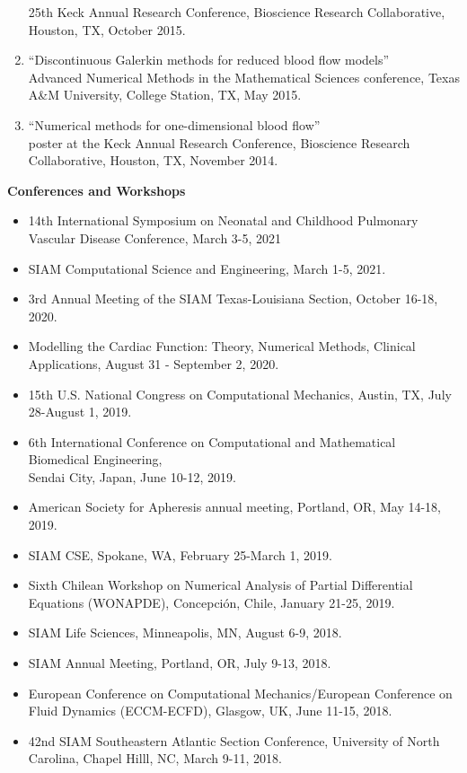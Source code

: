 \documentclass{article} %
\begin{document}
\begin{enumerate}
25th Keck Annual Research Conference, Bioscience Research Collaborative, Houston, TX,  October 2015.
\item ``Discontinuous Galerkin methods for reduced blood flow models'' \\
Advanced Numerical Methods in the Mathematical Sciences conference, Texas A\&M University, College Station, TX, May 2015.
\item ``Numerical methods for one-dimensional blood flow'' \\
poster at the Keck Annual Research Conference, Bioscience Research Collaborative, Houston, TX, November 2014. 
\end{enumerate}

\vspace{0.5cm}
\noindent
{\bf \large Conferences and Workshops}
\begin{itemize}
\item 14th International Symposium on Neonatal and Childhood Pulmonary Vascular Disease Conference, March 3-5, 2021
\item SIAM Computational Science and Engineering, March 1-5, 2021.
\item 3rd Annual Meeting of the SIAM Texas-Louisiana Section, October 16-18, 2020. 
\item Modelling the Cardiac Function: Theory, Numerical Methods, Clinical Applications, August 31 - September 2, 2020.
\item 15th U.S. National Congress on Computational Mechanics, Austin, TX, July 28-August 1, 2019.
\item 6th International Conference on Computational and Mathematical Biomedical Engineering,\\ Sendai City, Japan, June 10-12, 2019.
\item American Society for Apheresis annual meeting, Portland, OR, May 14-18, 2019.
\item SIAM CSE, Spokane, WA, February 25-March 1, 2019.
\item Sixth Chilean Workshop on Numerical Analysis of Partial Differential Equations (WONAPDE), Concepci\'on, Chile, January 21-25, 2019.
\item SIAM Life Sciences, Minneapolis, MN, August 6-9, 2018.
\item SIAM Annual Meeting, Portland, OR, July 9-13, 2018.
\item European Conference on Computational Mechanics/European Conference on Fluid Dynamics (ECCM-ECFD), Glasgow, UK, June 11-15, 2018.
\item 42nd SIAM Southeastern Atlantic Section Conference, University of North Carolina, Chapel Hilll, NC, March 9-11, 2018.

\end{itemize}
\end{document}

